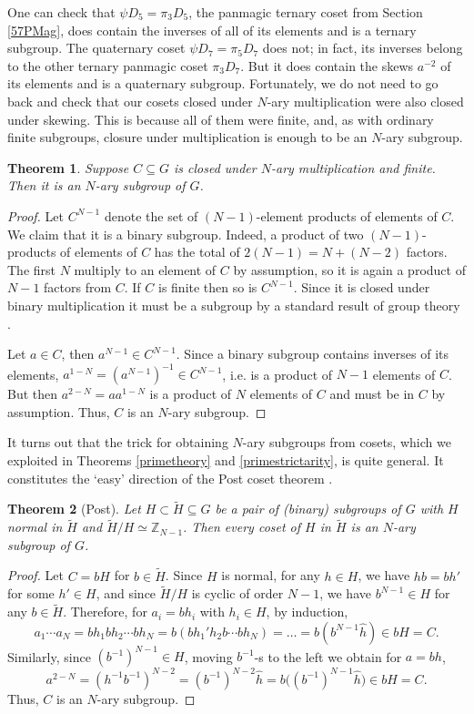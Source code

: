 \documentclass[11pt]{article}
\theoremstyle{plain}
\newtheorem{theorem}{Theorem}
\theoremstyle{definition}
\newcommand{\+}[1]{{#1}^\times}
\def\Z{{\mathbb Z}}
\def\H{\widetilde{H}}
\begin{document}
One can check that $\psi D_5=\pi_3D_5$, the panmagic ternary coset from Section \ref{57PMag}, does contain the inverses of all of its elements and is a ternary subgroup. The quaternary coset $\psi D_7=\pi_5D_7$ does not; in fact, its inverses belong to the other ternary panmagic coset $\pi_3D_7$. But it does contain the skews $a^{-2}$ of its elements and is a quaternary subgroup. Fortunately, we do not need to go back and check that our cosets closed under $N$-ary multiplication were also closed under skewing. This is because all of them were finite, and, as with ordinary finite subgroups, closure under multiplication is enough to be an $N$-ary subgroup.
\begin{theorem} Suppose $C\subseteq G$ is closed under $N$-ary multiplication and finite. Then it is an $N$-ary subgroup of $G$.
\end{theorem}
\begin{proof} Let $C^{N-1}$ denote the set of $(N-1)$-element products of elements of $C$. We claim that it is a binary subgroup. Indeed, a product of two $(N-1)$-products of elements of $C$ has the total of $2(N-1)=N+(N-2)$ factors. The first $N$ multiply to an element of $C$ by assumption, so it is again a product of $N-1$ factors from $C$. If $C$ is finite then so is $C^{N-1}$. Since it is closed under binary multiplication it must be a subgroup by a standard result of group theory \cite{Gallian}.

Let $a\in C$, then $a^{N-1}\in C^{N-1}$. Since a binary subgroup contains inverses of its elements, $a^{1-N}=(a^{N-1})^{-1}\in C^{N-1}$, i.e. is a product of $N-1$ elements of $C$. But then $a^{2-N}=aa^{1-N}$ is a product of $N$ elements of $C$ and must be in $C$ by assumption. Thus, $C$ is an $N$-ary subgroup.
\end{proof}
It turns out that the trick for obtaining $N$-ary subgroups from cosets, which we exploited in Theorems \ref{primetheory} and \ref{primestrictarity}, is quite general. It constitutes the `easy' direction of the Post coset theorem \cite{GBV,Shah}.
\begin{theorem}[Post]\label{PostConv} Let $H\subset\H\subseteq G$ be a pair of (binary) subgroups of $G$ with $H$ normal in $\H$ and $\H/H\simeq\Z_{N-1}$. Then every coset of $H$ in $\H$ is an $N$-ary subgroup of $G$.
\end{theorem}
\begin{proof} Let $C=bH$ for $b\in\H$. Since $H$ is normal, for any $h\in H$, we have $hb=bh'$ for some $h'\in H$, and since $\H/H$ is cyclic of order $N-1$, we have $b^{N-1}\in H$ for any $b\in\H$. Therefore, for $a_i=bh_i$ with $h_i\in H$, by induction,
$$
a_1\cdots a_N=bh_1 bh_2\cdots bh_N=b(bh_1'h_2b\cdots bh_N)=\dots=b(b^{N-1}\hat{h})\in bH=C.
$$
Similarly, since $(b^{-1})^{N-1}\in H$, moving $b^{-1}$-s to the left we obtain for $a=bh$, 
$$
a^{2-N}=(h^{-1}b^{-1})^{N-2}=(b^{-1})^{N-2}\hat{h}=b\big((b^{-1})^{N-1}\hat{h}\big)\in bH=C.
$$
Thus, $C$ is an $N$-ary subgroup.
\end{proof}
\end{document}
